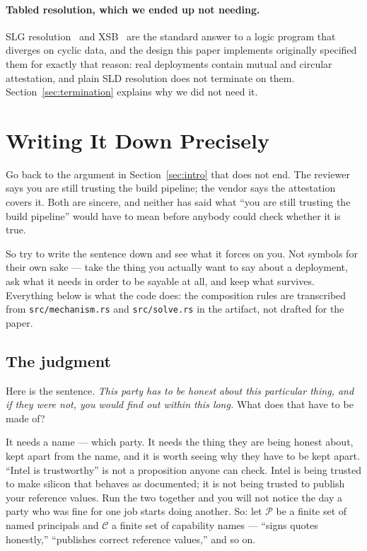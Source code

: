 \documentclass[11pt]{article}
\begin{document}
\paragraph{Tabled resolution, which we ended up not needing.} SLG
resolution~\cite{slg} and XSB~\cite{xsb} are the standard answer to a logic
program that diverges on cyclic data, and the design this paper implements
originally specified them for exactly that reason: real deployments contain
mutual and circular attestation, and plain SLD resolution does not terminate
on them. Section~\ref{sec:termination} explains why we did not need it.

\section{Writing It Down Precisely}
\label{sec:formal}

Go back to the argument in Section~\ref{sec:intro} that does not end. The
reviewer says you are still trusting the build pipeline; the vendor says the
attestation covers it. Both are sincere, and neither has said what ``you are
still trusting the build pipeline'' would have to mean before anybody could
check whether it is true.

So try to write the sentence down and see what it forces on you. Not symbols
for their own sake --- take the thing you actually want to say about a
deployment, ask what it needs in order to be sayable at all, and keep what
survives. Everything below is what the code does: the composition rules are
transcribed from \texttt{src/mechanism.rs} and \texttt{src/solve.rs} in the
artifact, not drafted for the paper.

\subsection{The judgment}

Here is the sentence. \emph{This party has to be honest about this particular
thing, and if they were not, you would find out within this long.} What does
that have to be made of?

It needs a name --- which party. It needs the thing they are being honest
about, kept apart from the name, and it is worth seeing why they have to be
kept apart. ``Intel is trustworthy'' is not a proposition anyone can check.
Intel is being trusted to make silicon that behaves as documented; it is not
being trusted to publish your reference values. Run the two together and you
will not notice the day a party who was fine for one job starts doing
another. So: let $\mathcal{P}$ be a finite set of named principals and
$\mathcal{C}$ a finite set of capability names --- ``signs quotes honestly,''
``publishes correct reference values,'' and so on.
\end{document}
